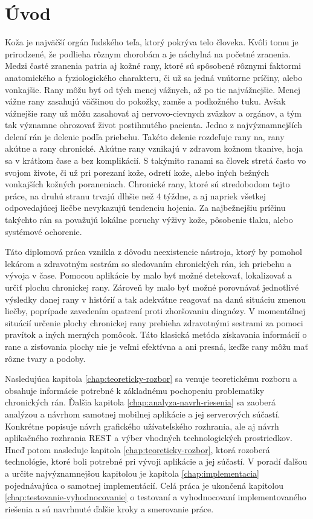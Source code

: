 \chapter{Úvod}
Koža je najväčší orgán ľudského teľa, ktorý pokrýva telo človeka. Kvôli tomu je prirodzené, že podlieha rôznym chorobám a je náchylná na početné zranenia. Medzi časté zranenia patria aj kožné rany, ktoré sú spôsobené rôznymi faktormi anatomického a fyziologického charakteru, či už sa jedná vnútorne príčiny, alebo vonkajšie. Rany môžu byť od tých menej vážnych, až po tie najvážnejšie. Menej vážne rany zasahujú väčšinou do pokožky, zamše a podkožného tuku. Avšak vážnejšie rany už môžu zasahovať aj nervovo-cievnych zväzkov a orgánov, a tým tak významne ohrozovať život postihnutého pacienta. Jedno z najvýznamnejších delení rán je delenie podľa priebehu. Takéto delenie rozdeľuje rany na, rany akútne a rany chronické. Akútne rany vznikajú v zdravom kožnom tkanive, hoja sa v krátkom čase a bez komplikácií. S takýmito ranami sa človek stretá často vo svojom živote, či už pri porezaní kože, odretí kože, alebo iných bežných vonkajších kožných poraneniach. Chronické rany, ktoré sú stredobodom tejto práce, na druhú stranu trvajú dlhšie než 4 týždne, a aj napriek všetkej odpovedajúcej liečbe nevykazujú tendenciu hojenia. Za najbežnejšiu príčinu takýchto rán sa považujú lokálne poruchy výživy kože, pôsobenie tlaku, alebo systémové ochorenie. 

Táto diplomová práca vznikla z dôvodu neexistencie nástroja, ktorý by pomohol lekárom a zdravotným sestrám so sledovaním chronických rán, ich priebehu a vývoja v čase. Pomocou aplikácie by malo byť možné detekovať, lokalizovať a určiť plochu chronickej rany. Zároveň by malo byť možné porovnávať jednotlivé výsledky danej rany v histórií a tak adekvátne reagovať na danú situáciu zmenou liečby, poprípade zavedením opatrení proti zhoršovaniu diagnózy. V momentálnej situácií určenie plochy chronickej rany prebieha zdravotnými sestrami za pomoci pravítok a iných merných pomôcok. Táto klasická metóda získavania informácií o rane a zisťovania plochy nie je veľmi efektívna a ani presná, keďže rany môžu mať rôzne tvary a podoby.
	
Nasledujúca kapitola \ref{chap:teoreticky-rozbor} sa venuje teoretickému rozboru a obsahuje informácie potrebné k základnému pochopeniu problematiky chronických rán. Ďalšia kapitola \ref{chap:analyza-navrh-riesenia} sa zaoberá analýzou a návrhom samotnej mobilnej aplikácie a jej serverových súčastí. Konkrétne popisuje návrh grafického užívateľského rozhrania, ale aj návrh aplikačného rozhrania REST a výber vhodných technologických prostriedkov. Hneď potom nasleduje kapitola \ref{chap:teoreticky-rozbor}, ktorá rozoberá technológie, ktoré boli potrebné pri vývoji aplikácie a jej súčastí. V poradí ďalšou a určite najvýznamnejšou kapitolou je kapitola \ref{chap:implementacia} pojednávajúca o samotnej implementácií. Celá práca je ukončená kapitolou \ref{chap:testovanie-vyhodnocovanie} o testovaní a vyhodnocovaní implementovaného riešenia a sú navrhnuté ďalšie kroky a smerovanie práce.